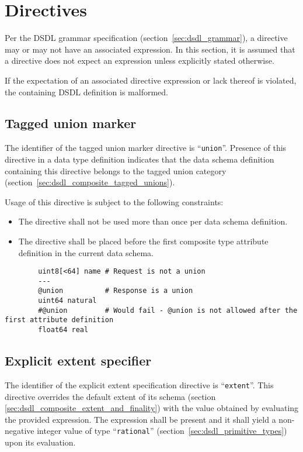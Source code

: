 \section{Directives}\label{sec:dsdl_directives}

Per the DSDL grammar specification (section~\ref{sec:dsdl_grammar}),
a directive may or may not have an associated expression.
In this section, it is assumed that a directive does not expect an expression unless explicitly stated otherwise.

If the expectation of an associated directive expression or lack thereof is violated,
the containing DSDL definition is malformed.

\subsection{Tagged union marker}

The identifier of the tagged union marker directive is ``\verb|union|''.
Presence of this directive in a data type definition indicates that the
data schema definition containing this directive belongs to the tagged union category
(section~\ref{sec:dsdl_composite_tagged_unions}).

Usage of this directive is subject to the following constraints:
\begin{itemize}
    \item The directive shall not be used more than once per data schema definition.
    \item The directive shall be placed before the first composite type attribute definition in the current data schema.
\end{itemize}

\begin{remark}
    \begin{verbatim}
        uint8[<64] name # Request is not a union
        ---
        @union          # Response is a union
        uint64 natural
        #@union         # Would fail - @union is not allowed after the first attribute definition
        float64 real
    \end{verbatim}
\end{remark}

\subsection{Explicit extent specifier}\label{sec:dsdl_directive_extent}

The identifier of the explicit extent specification directive is ``\verb|extent|''.
This directive overrides the default extent of its schema (section \ref{sec:dsdl_composite_extent_and_finality})
with the value obtained by evaluating the provided expression.
The expression shall be present and it shall yield a non-negative integer value of type
``\verb|rational|'' (section~\ref{sec:dsdl_primitive_types}) upon its evaluation.

